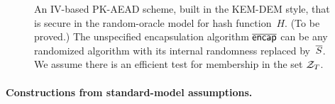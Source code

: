 \begin{figure}[tbhp]
\begin{center}

\medskip
\hspace*{.5ex} 
\caption{An IV-based PK-AEAD scheme, built in the KEM-DEM style,  that is secure in the random-oracle model for hash function~$H$. (To be proved.)  The unspecified encapsulation algorithm $\overline{\mathsf{encap}}$ can be any randomized algorithm with its internal randomness replaced by~$\overline{S}$.  We assume there is an efficient test for membership in the set $\mathcal{Z}_T$.
}
\label{fig:ro-kem-dem-construction}
\end{center}
\end{figure}

\paragraph{Constructions from standard-model assumptions. } 



